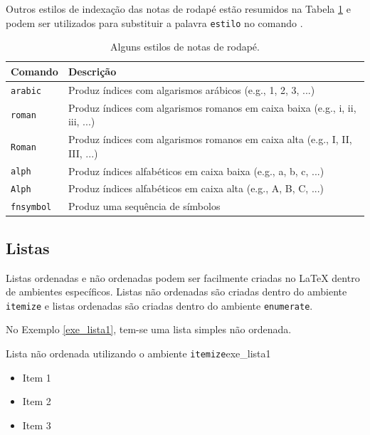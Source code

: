 Outros estilos de indexação das notas de rodapé estão resumidos na Tabela \ref{tab:estilos_notas_rodape} e podem ser utilizados para substituir a palavra {\tt estilo} no comando \texttt{\renewcommand{\thefootnote}{\estilo{footnote}}}.

\begin{table}[H]
\centering
\caption{Alguns estilos de notas de rodapé.}
\label{tab:estilos_notas_rodape}
    \begin{tabular}{p{2cm}p{10cm}}
	\toprule
    \textbf{Comando} & \textbf{Descrição} \\
	\midrule
    {\tt arabic}   & Produz índices com algarismos arábicos (e.g., 1, 2, 3, ...) \\
    {\tt roman}    & Produz índices com algarismos romanos em caixa baixa (e.g., i, ii, iii, ...) \\
    {\tt Roman}    & Produz índices com algarismos romanos em caixa alta (e.g., I, II, III, ...) \\
    {\tt alph}     & Produz índices alfabéticos em caixa baixa (e.g., a, b, c, ...) \\
    {\tt Alph}     & Produz índices alfabéticos em caixa alta (e.g., A, B, C, ...) \\
    {\tt fnsymbol} & Produz uma sequência de símbolos \\
    \bottomrule
    \end{tabular}
\end{table}

\subsection{Listas}
\label{sec:listas}

Listas ordenadas e não ordenadas podem ser facilmente criadas no \LaTeX{} dentro de ambientes específicos. Listas não ordenadas são criadas dentro do ambiente \texttt{itemize} e listas ordenadas são criadas dentro do ambiente \texttt{enumerate}.

No Exemplo \ref{exe_lista1}, tem-se uma lista simples não ordenada.

\begin{texexptitled}[breakable,enhanced,middle=2mm]{Lista não ordenada utilizando o ambiente \texttt{itemize}}{exe_lista1}
\begin{itemize}
    \item Item 1
    \item Item 2
    \item Item 3
\end{itemize}
\end{texexptitled}

